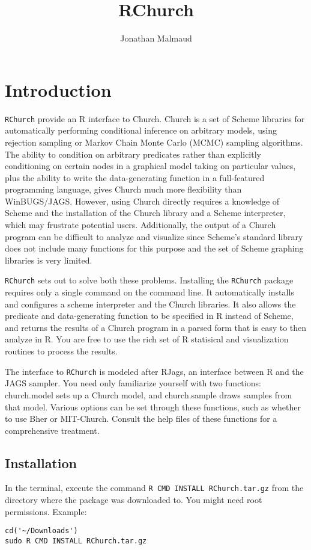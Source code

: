 \documentclass[12pt]{article}
\author{Jonathan Malmaud}
\title{RChurch}
\newcommand{\rchurch}{\texttt{RChurch}\xspace}
\newcommand{\church}{Church\xspace}
\newcommand{\R}{R\xspace}
\begin{document}
\maketitle

\section{Introduction}
\rchurch provide an \R interface to \church. \church is a set of Scheme libraries for automatically performing conditional inference on arbitrary models, using rejection sampling or Markov Chain Monte Carlo (MCMC) sampling algorithms. The ability to condition on arbitrary predicates rather than explicitly conditioning on certain nodes in a graphical model taking on particular values, plus the ability to write the data-generating function in a full-featured programming language, gives \church much more flexibility than WinBUGS/JAGS. However, using \church directly requires a knowledge of Scheme and the installation of the Church library and a Scheme interpreter, which may frustrate potential users. Additionally, the output of a \church program can be difficult to analyze and visualize since Scheme's standard library does not include many functions for this purpose and the set of Scheme graphing libraries is very limited. 

\rchurch sets out to solve both these problems. Installing the \rchurch package requires only a single command on the command line. It automatically installs and configures a scheme interpreter and the \church libraries. It also allows the predicate and data-generating function to be specified in \R instead of Scheme, and returns the results of a \church program in a parsed form that is easy to then analyze in \R. You are free to use the rich set of \R statisical and visualization routines to process the results. 

The interface to \rchurch is modeled after RJags, an interface between R and the JAGS sampler. You need only familiarize yourself with two functions: church.model sets up a \church model, and church.sample draws samples from that model. Various options can be set through these functions, such as whether to use Bher or MIT-Church. Consult the help files of these functions for a comprehensive treatment. 

\subsection{Installation}
In the terminal, execute the command \texttt{R CMD INSTALL RChurch.tar.gz} from the directory where the package was downloaded to. You might need root permissions. Example:
\begin{verbatim}
cd('~/Downloads')
sudo R CMD INSTALL RChurch.tar.gz
\end{verbatim}
\end{document}
